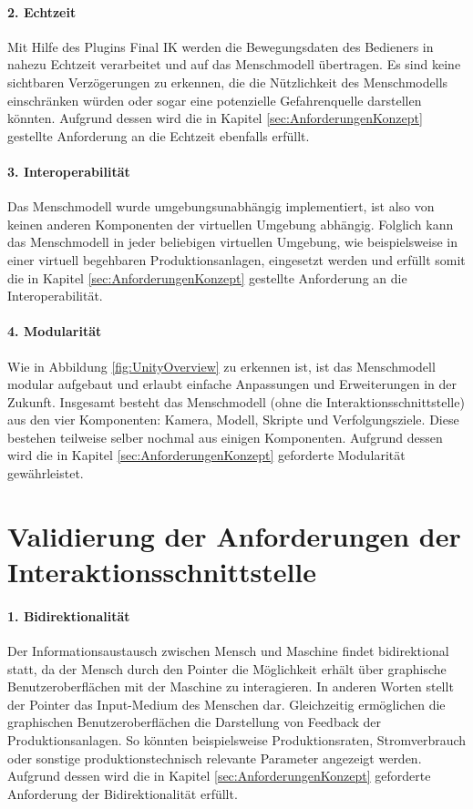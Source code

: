 \paragraph{2. Echtzeit}
\noindent Mit Hilfe des Plugins Final IK werden die Bewegungsdaten des Bedieners in nahezu Echtzeit verarbeitet und auf das Menschmodell übertragen. Es sind keine sichtbaren Verzögerungen zu erkennen, die die Nützlichkeit des Menschmodells einschränken würden oder sogar eine potenzielle Gefahrenquelle darstellen könnten. Aufgrund dessen wird die in Kapitel \ref{sec:AnforderungenKonzept} gestellte Anforderung an die Echtzeit ebenfalls erfüllt.
	
\paragraph{3. Interoperabilität}
\noindent Das Menschmodell wurde umgebungsunabhängig implementiert, ist also von keinen anderen Komponenten der virtuellen Umgebung abhängig. Folglich kann das Menschmodell in jeder beliebigen virtuellen Umgebung, wie beispielsweise in einer virtuell begehbaren Produktionsanlagen, eingesetzt werden und erfüllt somit die in Kapitel \ref{sec:AnforderungenKonzept} gestellte Anforderung an die Interoperabilität.
	
\paragraph{4. Modularität}
\noindent Wie in Abbildung \ref{fig:UnityOverview} zu erkennen ist, ist das Menschmodell modular aufgebaut und erlaubt einfache Anpassungen und Erweiterungen in der Zukunft. Insgesamt besteht das Menschmodell (ohne die Interaktionsschnittstelle) aus den vier Komponenten: Kamera, Modell, Skripte und Verfolgungsziele. Diese bestehen teilweise selber nochmal aus einigen Komponenten. Aufgrund dessen wird die in Kapitel \ref{sec:AnforderungenKonzept} geforderte Modularität gewährleistet.

\section{Validierung der Anforderungen der Interaktionsschnittstelle}\label{sec:ValidInteraktion}

\paragraph{1. Bidirektionalität}
\noindent Der Informationsaustausch zwischen Mensch und Maschine findet bidirektional statt, da der Mensch durch den Pointer die Möglichkeit erhält über graphische Benutzeroberflächen mit der Maschine zu interagieren. In anderen Worten stellt der Pointer das Input-Medium des Menschen dar. Gleichzeitig ermöglichen die graphischen Benutzeroberflächen die Darstellung von Feedback der Produktionsanlagen. So könnten beispielsweise Produktionsraten, Stromverbrauch oder sonstige produktionstechnisch relevante Parameter angezeigt werden. Aufgrund dessen wird die in Kapitel \ref{sec:AnforderungenKonzept} geforderte Anforderung der Bidirektionalität erfüllt.
	
